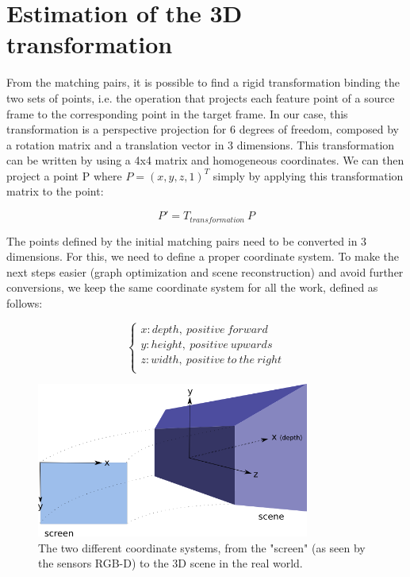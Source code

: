 \section{Estimation of the 3D transformation}
\label{sec:transformation}

From the matching pairs, it is possible to find a rigid transformation binding the two sets of points, i.e. the operation that projects each feature point of a source frame to the corresponding point in the target frame. In our case, this transformation is a perspective projection for 6 degrees of freedom, composed by a rotation matrix and a translation vector in 3 dimensions. This transformation can be written by using a 4x4  matrix and homogeneous coordinates. We can then project a point P where $P = (x,y,z,1)^T$ simply by applying this transformation matrix to the point:

\[
P' = T_{transformation} \: P
\]

The points defined by the initial matching pairs need to be converted in 3 dimensions. For this, we need to define a proper coordinate system. To make the next steps easier (graph optimization and scene reconstruction) and avoid further conversions, we keep the same coordinate system for all the work, defined as follows:

\[
\left\{\begin{array}{l}
x: depth,\:positive\:forward\\
y: height,\:positive\:upwards\\
z: width,\:positive\:to\:the\:right\\
\end{array}
\right.
\]

\begin{figure}[H]
\centering
\includegraphics[width=0.8\textwidth]{figures/coordinates}
\caption{The two different coordinate systems, from the "screen" (as seen by the sensors RGB-D) to the 3D scene in the real world.}
\end{figure}

